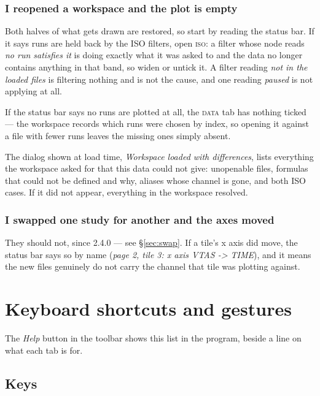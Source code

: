 \documentclass[11pt,a4paper,oneside]{report}
\newcommand{\appver}{2.4.0}
\newcommand{\tab}[1]{\textsc{#1}}
\begin{document}
\subsection{I reopened a workspace and the plot is empty}

Both halves of what gets drawn are restored, so start by reading the status bar.
If it says runs are held back by the ISO filters, open \tab{iso}: a filter whose
node reads \emph{no run satisfies it} is doing exactly what it was asked to and
the data no longer contains anything in that band, so widen or untick it. A
filter reading \emph{not in the loaded files} is filtering nothing and is not
the cause, and one reading \emph{paused} is not applying at all.

If the status bar says no runs are plotted at all, the \tab{data} tab has
nothing ticked --- the workspace records which runs were chosen by index, so
opening it against a file with fewer runs leaves the missing ones simply absent.

The dialog shown at load time, \emph{Workspace loaded with differences}, lists
everything the workspace asked for that this data could not give: unopenable
files, formulas that could not be defined and why, aliases whose channel is
gone, and both ISO cases. If it did not appear, everything in the workspace
resolved.

\subsection{I swapped one study for another and the axes moved}

They should not, since \appver{} --- see \S\ref{sec:swap}. If a tile's x axis
did move, the status bar says so by name (\emph{page 2, tile 3: x axis VTAS ->
TIME}), and it means the new files genuinely do not carry the channel that tile
was plotting against.

\appendix

\chapter{Keyboard shortcuts and gestures}

The \emph{Help} button in the toolbar shows this list in the program, beside a
line on what each tab is for.

\section{Keys}
\end{document}
